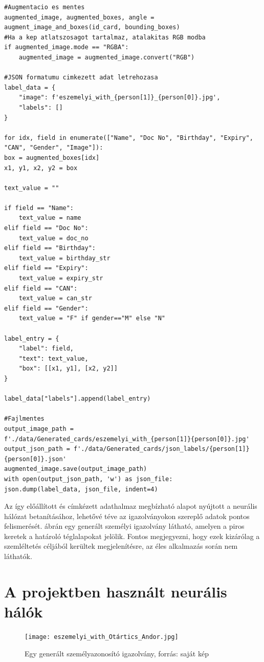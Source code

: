 \documentclass[
]{thesis-ekf}
\theoremstyle{definition}
\theoremstyle{remark}
\begin{document}
\begin{lstlisting}[style=mypython,caption=Augmentáció és fájlmentés, label=kod-python2]
#Augmentacio es mentes
augmented_image, augmented_boxes, angle = augment_image_and_boxes(id_card, bounding_boxes)
#Ha a kep atlatszosagot tartalmaz, atalakitas RGB modba
if augmented_image.mode == "RGBA":
	augmented_image = augmented_image.convert("RGB")

#JSON formatumu cimkezett adat letrehozasa
label_data = {
	"image": f'eszemelyi_with_{person[1]}_{person[0]}.jpg',
	"labels": []
}

for idx, field in enumerate(["Name", "Doc No", "Birthday", "Expiry", "CAN", "Gender", "Image"]):
box = augmented_boxes[idx]
x1, y1, x2, y2 = box

text_value = ""

if field == "Name":  
	text_value = name  
elif field == "Doc No":  
	text_value = doc_no  
elif field == "Birthday":  
	text_value = birthday_str  
elif field == "Expiry":  
	text_value = expiry_str  
elif field == "CAN":  
	text_value = can_str  
elif field == "Gender":  
	text_value = "F" if gender=="M" else "N"  

label_entry = {  
	"label": field,  
	"text": text_value,  
	"box": [[x1, y1], [x2, y2]]  
}  

label_data["labels"].append(label_entry)

#Fajlmentes
output_image_path = f'./data/Generated_cards/eszemelyi_with_{person[1]}{person[0]}.jpg'
output_json_path = f'./data/Generated_cards/json_labels/{person[1]}{person[0]}.json'
augmented_image.save(output_image_path)
with open(output_json_path, 'w') as json_file:
json.dump(label_data, json_file, indent=4)

\end{lstlisting}

Az így előállított és címkézett adathalmaz megbízható alapot nyújtott a neurális hálózat betanításához, lehetővé téve az igazolványokon szereplő adatok pontos felismerését.  ábrán egy generált személyi igazolvány látható, amelyen a piros keretek a határoló téglalapokat jelölik. Fontos megjegyezni, hogy ezek kizárólag a szemléltetés céljából kerültek megjelenítésre, az éles alkalmazás során nem láthatók.

\section{A projektben használt neurális hálók}

\begin{figure}[H]
	\centering
	\texttt{[image: eszemelyi\_with\_Otártics\_Andor.jpg]}
	\caption{Egy generált személyazonosító igazolvány, forrás: saját kép }
	\label{fig-eszemelyi-generated}
\end{figure}
\end{document}
